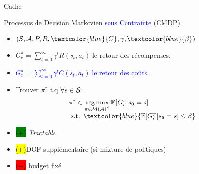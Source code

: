 \documentclass[french]{beamer}
\newcommand{\cplus}{\colorbox{green}{($+$)} }
\newcommand{\cmoins}{\colorbox{red}{($-$)} }
\newcommand{\cmean}{\colorbox{yellow}{($\pm$)}}
\begin{document}
    \begin{frame}{Cadre}

        \begin{block}{Processus de Decision Markovien \textcolor{blue}{sous Contrainte} (CMDP)}
            \begin{itemize}
                \item $(\cS, \cA, P, R,\textcolor{blue}{C}, \gamma,\textcolor{blue}{\beta})$
                \item $G_r^\pi = \sum_{t=0}^\infty \gamma^t R(s_t, a_t)$ le retour des récompenses.
                \item \textcolor{blue}{ $G_c^\pi = \sum_{t=0}^\infty \gamma^t C(s_t, a_t)$ le retour des coûts.}
                \item Trouver $\pi^*$ t.q $\forall s\in\mathcal{S}$:
                \begin{equation}
                    \label{eq:cmdp}
                    \begin{array}{lcr}
                        \displaystyle \pi^* \in \argmax_{\pi\in\cM(\cA)^\cS} \expectedvalue[G_r^\pi | s_0=s] \\
                        \text{ s.t. }  \textcolor{blue}{\expectedvalue[G_c^\pi | s_0=s] \leq \beta}
                    \end{array}
                \end{equation}
            \end{itemize}
        \end{block}

        \begin{block}{}
            \begin{itemize}
                \item \cplus \textit{Tractable}
                \item \cmean DOF supplémentaire (si mixture de politiques) %
                \item \cmoins budget fixé


            \end{itemize}
        \end{block}

    \end{frame}
\end{document}
